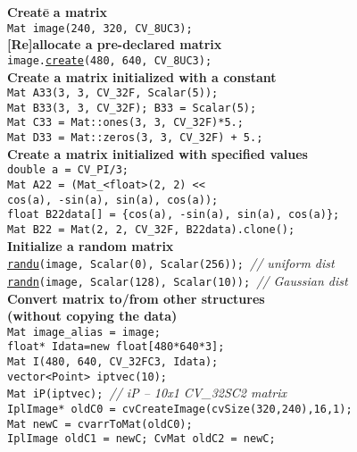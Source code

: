 \documentclass[10pt,landscape]{article}
\begin{document}
\begin{multicols}{3}
\begin{tabbing}
\textbf{Cr}\=\textbf{ea}\=\textbf{te}\={} \textbf{a matrix} \\
\> \texttt{Mat image(240, 320, CV\_8UC3);} \\

\textbf{[Re]allocate a pre-declared matrix}\\
\> \texttt{image.\href{http://opencv.willowgarage.com/documentation/cpp/core_basic_structures.html\#Mat::create}{create}(480, 640, CV\_8UC3);}\\

\textbf{Create a matrix initialized with a constant}\\
\> \texttt{Mat A33(3, 3, CV\_32F, Scalar(5));} \\
\> \texttt{Mat B33(3, 3, CV\_32F); B33 = Scalar(5);} \\
\> \texttt{Mat C33 = Mat::ones(3, 3, CV\_32F)*5.;} \\
\> \texttt{Mat D33 = Mat::zeros(3, 3, CV\_32F) + 5.;} \\

\textbf{Create a matrix initialized with specified values}\\
\> \texttt{double a = CV\_PI/3;} \\
\> \texttt{Mat A22 = (Mat\_<float>(2, 2) <<} \\
\> \> \texttt{cos(a), -sin(a), sin(a), cos(a));} \\
\> \texttt{float B22data[] = \{cos(a), -sin(a), sin(a), cos(a)\};} \\
\> \texttt{Mat B22 = Mat(2, 2, CV\_32F, B22data).clone();}\\

\textbf{Initialize a random matrix}\\
\> \texttt{\href{http://opencv.willowgarage.com/documentation/cpp/core_operations_on_arrays.html\#cv-randu}{randu}(image, Scalar(0), Scalar(256)); }\textit{// uniform dist}\\
\> \texttt{\href{http://opencv.willowgarage.com/documentation/cpp/core_operations_on_arrays.html\#cv-randn}{randn}(image, Scalar(128), Scalar(10)); }\textit{// Gaussian dist}\\

\textbf{Convert matrix to/from other structures}\\
\>\textbf{(without copying the data)}\\
\> \texttt{Mat image\_alias = image;}\\
\> \texttt{float* Idata=new float[480*640*3];}\\
\> \texttt{Mat I(480, 640, CV\_32FC3, Idata);}\\
\> \texttt{vector<Point> iptvec(10);}\\
\> \texttt{Mat iP(iptvec); }\textit{// iP -- 10x1 CV\_32SC2 matrix}\\
\> \texttt{IplImage* oldC0 = cvCreateImage(cvSize(320,240),16,1);}\\
\> \texttt{Mat newC = cvarrToMat(oldC0);}\\
\> \texttt{IplImage oldC1 = newC; CvMat oldC2 = newC;}\\


\end{tabbing}
\end{multicols}
\end{document}
